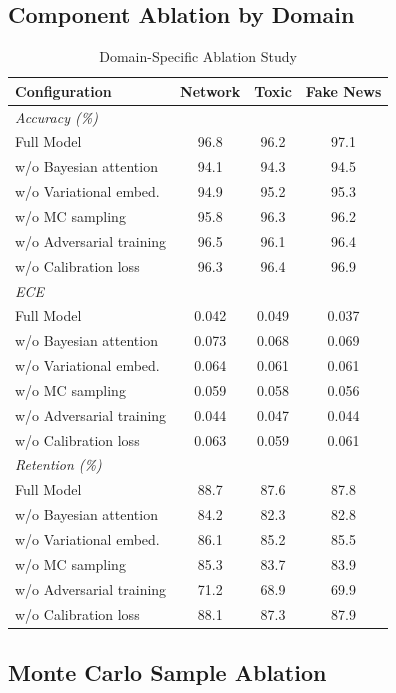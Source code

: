 \documentclass[12pt,a4paper]{article}
\theoremstyle{definition}
\begin{document}
\subsection{Component Ablation by Domain}

\begin{table}[H]
\caption{Domain-Specific Ablation Study}
\label{tab:domain_ablation}
\centering
\footnotesize
\setlength{\tabcolsep}{3pt}
\begin{tabular}{@{}lccc@{}}
\toprule
\textbf{Configuration} & \textbf{Network} & \textbf{Toxic} & \textbf{Fake News} \\
\midrule
\multicolumn{4}{l}{\textit{Accuracy (\%)}} \\
Full Model & 96.8 & 96.2 & 97.1 \\
w/o Bayesian attention & 94.1 & 94.3 & 94.5 \\
w/o Variational embed. & 94.9 & 95.2 & 95.3 \\
w/o MC sampling & 95.8 & 96.3 & 96.2 \\
w/o Adversarial training & 96.5 & 96.1 & 96.4 \\
w/o Calibration loss & 96.3 & 96.4 & 96.9 \\
\midrule
\multicolumn{4}{l}{\textit{ECE}} \\
Full Model & 0.042 & 0.049 & 0.037 \\
w/o Bayesian attention & 0.073 & 0.068 & 0.069 \\
w/o Variational embed. & 0.064 & 0.061 & 0.061 \\
w/o MC sampling & 0.059 & 0.058 & 0.056 \\
w/o Adversarial training & 0.044 & 0.047 & 0.044 \\
w/o Calibration loss & 0.063 & 0.059 & 0.061 \\
\midrule
\multicolumn{4}{l}{\textit{Retention (\%)}} \\
Full Model & 88.7 & 87.6 & 87.8 \\
w/o Bayesian attention & 84.2 & 82.3 & 82.8 \\
w/o Variational embed. & 86.1 & 85.2 & 85.5 \\
w/o MC sampling & 85.3 & 83.7 & 83.9 \\
w/o Adversarial training & 71.2 & 68.9 & 69.9 \\
w/o Calibration loss & 88.1 & 87.3 & 87.9 \\
\bottomrule
\end{tabular}
\end{table}

\subsection{Monte Carlo Sample Ablation}
\end{document}
